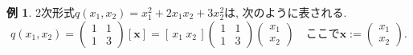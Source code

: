 \documentclass[dvipdfmx,a4paper,11pt]{article} %
\theoremstyle{definition}
\newtheorem{ex}[thm]{例}
\begin{document}
\begin{ex}
2次形式\(q(x_1,x_2)=x_1^2+2x_1x_2+3x_2^2\)は, 次のように表される.
\[
q(x_1,x_2)
=
\begin{pmatrix}
1&1\\
1&3
\end{pmatrix}
[\bm{x}]
=
[\,x_1\ x_2\,]
\begin{pmatrix}
1&1\\
1&3
\end{pmatrix}
\begin{pmatrix}
x_1\\
x_2
\end{pmatrix}
\quad
\text{ここで}
\bm{x}:=
\begin{pmatrix}
x_1\\
x_2
\end{pmatrix}.
\]
\end{ex}

\end{document}
